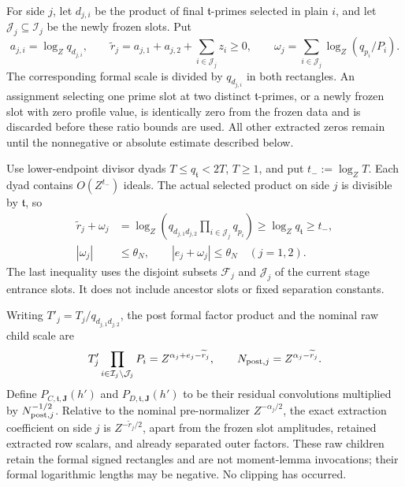 \documentclass[12pt]{article}
\begin{document}
For side \(j\), let \(d_{j,i}\) be the product of final
\(\mathfrak t\)-primes selected in plain \(i\), and let
\(\mathcal J_j\subseteq\mathcal I_j\) be the newly frozen slots.  Put
\[
 a_{j,i}=\log_Zq_{d_{j,i}},\qquad
 \widetilde r_j=a_{j,1}+a_{j,2}+\sum_{i\in\mathcal J_j}z_i\ge0,
 \qquad
 \omega_j=\sum_{i\in\mathcal J_j}\log_Z(q_{p_i}/P_i).
\]
The corresponding formal scale is divided by \(q_{d_{j,i}}\) in both
rectangles.  An assignment selecting one prime slot at two distinct
\(\mathfrak t\)-primes, or a newly frozen slot with zero profile value,
is identically zero from the frozen data and is discarded before these
ratio bounds are used.  All other extracted zeros remain until the
nonnegative or absolute estimate described below.

Use lower-endpoint divisor dyads \(T\le q_{\mathfrak t}<2T\),
\(T\ge1\), and put \(t_-:=\log_ZT\).  Each dyad contains
\(O(Z^{t_-})\) ideals.  The actual selected product on side \(j\)
is divisible by \(\mathfrak t\), so
\begin{equation}
 \begin{aligned}
 \widetilde r_j+\omega_j
 &=\log_Z\left(q_{d_{j,1}d_{j,2}}
                  \prod_{i\in\mathcal J_j}q_{p_i}\right)
 \ge\log_Zq_{\mathfrak t}\ge t_-,\\
 |\omega_j|&\le\theta_N,\qquad |e_j+\omega_j|\le\theta_N
 \quad(j=1,2).
 \end{aligned}
 \label{eq:centered-divisor-boundary}
\end{equation}
The last inequality uses the disjoint subsets \(\mathcal F_j\) and
\(\mathcal J_j\) of the current stage entrance slots.  It does not
include ancestor slots or fixed separation constants.

Writing \(T'_j=T_j/q_{d_{j,1}d_{j,2}}\), the post formal factor product
and the nominal raw child scale are
\begin{equation}
 T'_j\prod_{i\in\mathcal I_j\setminus\mathcal J_j}P_i
   =Z^{\alpha_j+e_j-\widetilde r_j},\qquad
 N_{{\rm post},j}=Z^{\alpha_j-\widetilde r_j}.
 \label{eq:centered-raw-normalization}
\end{equation}
Define \(P_{C,\mathfrak t,\mathbf J}(h')\) and
\(P_{D,\mathfrak t,\mathbf J}(h')\) to be their residual convolutions
multiplied by \(N_{{\rm post},j}^{-1/2}\).  Relative to the nominal
pre-normalizer \(Z^{-\alpha_j/2}\), the exact extraction coefficient
on side \(j\) is \(Z^{-\widetilde r_j/2}\), apart from the frozen slot
amplitudes, retained extracted row scalars, and already separated outer
factors.  These raw children retain the formal signed rectangles and are
not moment-lemma invocations; their formal logarithmic lengths may be
negative.  No clipping has occurred.
\end{document}
